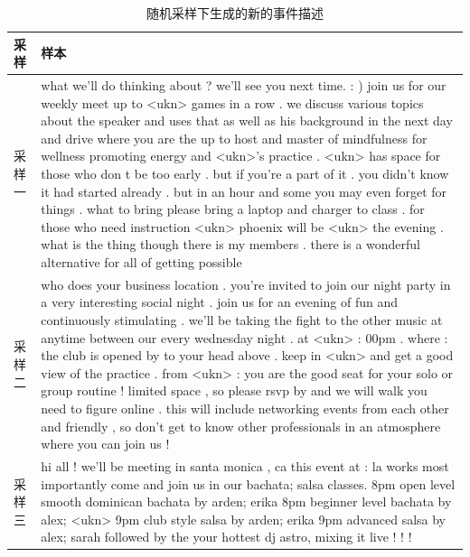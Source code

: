 \begin{longtable}{p{.1\linewidth}p{.85\linewidth}}
\caption{\label{t3-4}随机采样下生成的新的事件描述}\\
\toprule
采样&样本\\
\midrule
\endhead
\bottomrule
\endfoot
采样一& what we'll do thinking about ? we'll see you next time. : ) join us for our weekly meet up to <ukn> games in a row . we discuss various topics about the speaker and uses that as well as his background in the next day and drive where you are the up to host and master of mindfulness for wellness promoting energy and <ukn>'s practice . <ukn> has space for those who don t be too early . but if you're a part of it . you didn't know it had started already . but in an hour and some you may even forget for things . what to bring please bring a laptop and charger to class . for those who need instruction <ukn> phoenix will be <ukn> the evening . what is the thing though there is my members . there is a wonderful alternative for all of getting possible  \\
采样二 & who does your business location . you're invited to join our night party in a very interesting social night . join us for an evening of fun and continuously stimulating . we'll be taking the fight to the other music at anytime between our every wednesday night . at <ukn> : 00pm . where : the club is opened by to your head above . keep in <ukn> and get a good view of the practice . from <ukn> : you are the good seat for your solo or group routine ! limited space , so please rsvp by and we will walk you need to figure online . this will include networking events from each other and friendly , so don't get to know other professionals in an atmosphere where you can join us ! \\
采样三& hi all ! we'll be meeting in santa monica , ca this event at : la works most importantly come and join us in our bachata; salsa classes. 8pm open level smooth dominican bachata by arden; erika 8pm beginner level bachata by alex; <ukn> 9pm club style salsa by arden; erika 9pm advanced salsa by alex; sarah followed by the your hottest dj astro, mixing it live ! ! !\\
\end{longtable}

%  
